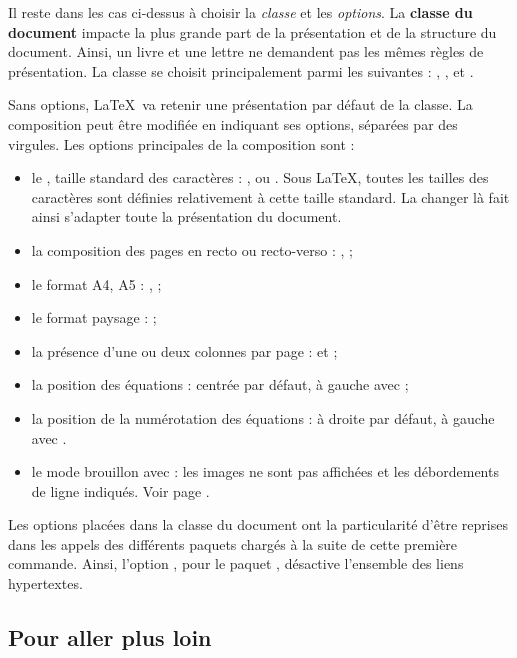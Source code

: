 Il reste dans les cas ci-dessus à choisir la \emph{classe} et les \emph{options}. La \textbf{classe du document} impacte la plus grande part de la présentation et de la structure du document. Ainsi, un livre et une lettre ne demandent pas les mêmes règles de présentation. La classe se choisit principalement parmi les suivantes : , ,  et . 

Sans options, \LaTeX\ va retenir une présentation par défaut de la classe. La composition peut être modifiée en indiquant ses options, séparées par des virgules. Les options principales de la composition sont :
\begin{itemize}
\item le , taille standard des caractères : \macron{10pt}, \macron{11pt} ou \macron{12pt}. Sous \LaTeX, toutes les tailles des caractères sont définies relativement à cette taille standard. La changer là fait ainsi s'adapter toute la présentation du document.
\item la composition des pages en recto ou recto-verso : ,  ;
\item le format A4, A5 : ,  ;
\item le format paysage :  ;
\item la présence d'une ou deux colonnes par page :  et  ; 
\item la position des équations : centrée par défaut, à gauche avec  ; 
\item la position de la numérotation des équations : à droite par défaut, à gauche avec . 
\item le mode brouillon avec  : les images ne sont pas affichées et les débordements de ligne indiqués. Voir page \pageref{cesure}. \\
\end{itemize}

Les options placées dans la classe du document ont la particularité d'être reprises dans les appels des différents paquets chargés à la suite de cette première commande. Ainsi, l'option , pour le paquet , désactive l'ensemble des liens hypertextes.

\subsection{Pour aller plus loin}

